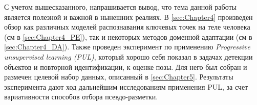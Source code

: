 С учетом вышесказанного, напрашивается вывод, что тема данной работы является полезной и важной в нынешних реалиях. В \autoref{sec:Chapter4} произведен обзор как различных моделей распознавания ключевых точек на теле человека (см в \autoref{sec:Chapter4_PE}), так и некоторых методов доменной адаптации (см в \autoref{sec:Chapter4_DA}). Также проведен эксперимент по применению \textit{Progressive unsupervised learning (PUL)}, который хорошо себя показал в задачах детекции объектов и повторной идентификации, к оценке позы. Для него был собран и размечен целевой набор данных, описанный в \autoref{sec:Chapter5}. Результаты эксперимента дают ход дальнейшим исследованиям применения PUL, за счет вариативности способов отбора псевдо-разметки.


\newpage